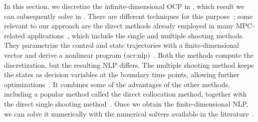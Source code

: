 In this section, we discretize the infinite-dimensional OCP in , which result we can subsequently solve in .
There are different techniques for this purpose~\citep{grune2017nonlinear,rawlings2017model}; some relevant to our approach are the direct methods already employed in many MPC-related applications~\citep{rawlings2017model}, which include the single and multiple shooting methods. They parametrize the control and state trajectories with a finite-dimensional vector and derive a nonlinear program (\Gls{acr:nlp})~\citep{rawlings2017model}. Both the methods compute the discretization, but the resulting NLP differs. The multiple shooting method keeps the states as decision variables at the boundary time points, allowing further optimizations~\citep{rawlings2017model}. It combines some of the advantages of the other methods, including a popular method called the direct collocation method, together with the direct single shooting method~\citep{diehl2006fast,grune2017nonlinear}. Once we obtain the finite-dimensional NLP, we can solve it numerically with the numerical solvers available in the literature~\citep{diehl2006fast,grune2017nonlinear,nocedal2006numerical}. 

